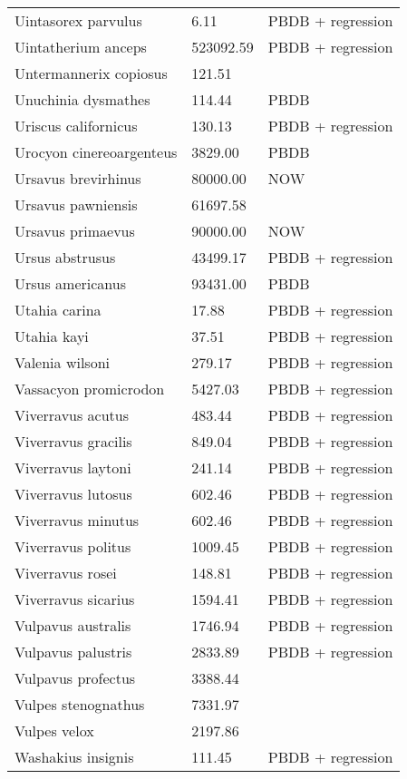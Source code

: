 \begin{center}
\begin{longtable}{p{} p{} p{} }
  Uintasorex parvulus & 6.11 & PBDB + regression \\ 
  Uintatherium anceps & 523092.59 & PBDB + regression \\ 
  Untermannerix copiosus & 121.51 & \cite{Tomiya2013} \\ 
  Unuchinia dysmathes & 114.44 & PBDB \\ 
  Uriscus californicus & 130.13 & PBDB + regression \\ 
  Urocyon cinereoargenteus & 3829.00 & PBDB \\ 
  Ursavus brevirhinus & 80000.00 & NOW \\ 
  Ursavus pawniensis & 61697.58 & \cite{Tomiya2013} \\ 
  Ursavus primaevus & 90000.00 & NOW \\ 
  Ursus abstrusus & 43499.17 & PBDB + regression \\ 
  Ursus americanus & 93431.00 & PBDB \\ 
  Utahia carina & 17.88 & PBDB + regression \\ 
  Utahia kayi & 37.51 & PBDB + regression \\ 
  Valenia wilsoni & 279.17 & PBDB + regression \\ 
  Vassacyon promicrodon & 5427.03 & PBDB + regression \\ 
  Viverravus acutus & 483.44 & PBDB + regression \\ 
  Viverravus gracilis & 849.04 & PBDB + regression \\ 
  Viverravus laytoni & 241.14 & PBDB + regression \\ 
  Viverravus lutosus & 602.46 & PBDB + regression \\ 
  Viverravus minutus & 602.46 & PBDB + regression \\ 
  Viverravus politus & 1009.45 & PBDB + regression \\ 
  Viverravus rosei & 148.81 & PBDB + regression \\ 
  Viverravus sicarius & 1594.41 & PBDB + regression \\ 
  Vulpavus australis & 1746.94 & PBDB + regression \\ 
  Vulpavus palustris & 2833.89 & PBDB + regression \\ 
  Vulpavus profectus & 3388.44 & \cite{Williamson2013} \\ 
  Vulpes stenognathus & 7331.97 & \cite{Tomiya2013} \\ 
  Vulpes velox & 2197.86 & \cite{Smith2004} \\ 
  Washakius insignis & 111.45 & PBDB + regression \\ 

\end{longtable}
\end{center}
